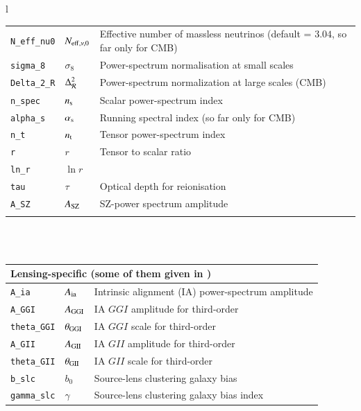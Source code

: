 \documentclass[11pt, chapterprefix, headsepline]{scrartcl}
\begin{document}
\begin{longtable}{l}
\begin{minipage}{\textwidth}
\begin{tabularx}{\textwidth}{llX}
  \texttt{N\_eff\_nu0} & $N_{{\rm eff}, \nu, 0}$ & Effective number of massless neutrinos (default = $3.04$, so far only for CMB) \\
  \texttt{sigma\_8}  & $\sigma_8$ & Power-spectrum normalisation at small scales \\
  \texttt{Delta\_2\_R} & $\Delta^2_{\cal R}$ & Power-spectrum normalization at large scales (CMB) \\
  \texttt{n\_spec}   & $n_{\rm s}$ & Scalar power-spectrum index \\
  \texttt{alpha\_s}  & $\alpha_{\rm s}$ & Running spectral index (so far only for CMB) \\
  \texttt{n\_t}      & $n_{\rm t}$ & Tensor power-spectrum index \\
  \texttt{r}         & $r$ & Tensor to scalar ratio \\
  \texttt{ln\_r}     & $\ln r$ & \\
  \texttt{tau}       & $\tau$ & Optical depth for reionisation \\
  \texttt{A\_SZ}     & $A_{\rm SZ}$ & SZ-power spectrum amplitude \\ \\
\end{tabularx}
\end{minipage}
\\ \\

\begin{minipage}{\textwidth}
\begin{tabularx}{\textwidth}{llX}
  \\
 \hline \multicolumn{3}{l}{\rul Lensing-specific \quad (some of them given in \file{cosmo\_lens.par})} \\ \hline
  \texttt{A\_ia}      & $A_{\rm ia}$  & Intrinsic alignment (IA) power-spectrum amplitude \citep{CFHTLenS-IA} \\
  \texttt{A\_GGI}     & $A_{\rm GGI}$ & IA $GGI$ amplitude for third-order \citep[][eq.~(42)]{CFHTLenS-2pt-notomo} \\
  \texttt{theta\_GGI} & $\theta_{\rm GGI}$ & IA $GGI$ scale for third-order \\
  \texttt{A\_GII}     & $A_{\rm GII}$ & IA $GII$ amplitude for third-order \\
  \texttt{theta\_GII} & $\theta_{\rm GII}$ & IA $GII$ scale for third-order \\
  \texttt{b\_slc}     & $b_0$ & Source-lens clustering galaxy bias \citep[][eq.~(41)]{CFHTLenS-2pt-notomo} \\ 
  \texttt{gamma\_slc} & $\gamma$ & Source-lens clustering galaxy bias index \\
  \end{tabularx}
  \end{minipage}
\\


\end{longtable}
\end{document}
